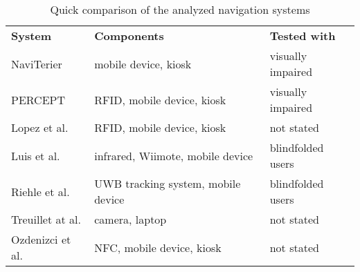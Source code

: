 \begin{table}[htbp]
  \centering
  \caption{Quick comparison of the analyzed navigation systems}
  \label{tab:navSysComp}
 \renewcommand{\arraystretch}{1.2}
    \begin{tabularx}{\textwidth}{p{2.6cm}|X|X}
    \rowcolor{mygray}
    \textbf{System} & \textbf{Components} & \textbf{Tested with} \\
    NaviTerier & mobile device, kiosk & visually impaired  \\ \hline
    PERCEPT & RFID, mobile device, kiosk & visually impaired  \\ \hline
    Lopez et al. & RFID, mobile device, kiosk & not stated \\ \hline
    Luis et al. & infrared, Wiimote, mobile device & blindfolded users \\ \hline
    Riehle et al. & UWB tracking system, mobile device & blindfolded users \\ \hline
    Treuillet at al. & camera, laptop & not stated \\ \hline
    Ozdenizci et al. & NFC, mobile device, kiosk & not stated \\
    \end{tabularx}%
\end{table}%

